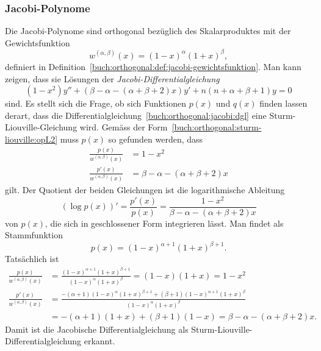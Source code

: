 \subsubsection{Jacobi-Polynome}
Die Jacobi-Polynome sind orthogonal bezüglich des Skalarproduktes
mit der Gewichtsfunktion
\[
w^{(\alpha,\beta)}(x) = (1-x)^\alpha(1+x)^\beta,
\]
definiert in Definition~\ref{buch:orthogonal:def:jacobi-gewichtsfunktion}.
Man kann zeigen, dass sie Lösungen der
{\em Jacobi-Diffe\-ren\-tial\-gleichung}
%
%
\begin{equation}
(1-x^2)y'' + (\beta-\alpha-(\alpha+\beta + 2)x)y' + n(n+\alpha+\beta+1)y=0
\label{buch:orthogonal:jacobi:dgl}
\end{equation}
sind.
Es stellt sich die Frage, ob sich Funktionen $p(x)$ und $q(x)$ finden lassen
derart, dass die Differentialgleichung~\eqref{buch:orthogonal:jacobi:dgl}
eine Sturm-Liouville-Gleichung wird.
Gemäss der Form~\eqref{buch:orthogonal:sturm-liouville:opL2} muss
$p(x)$ so gefunden werden, dass
\begin{align*}
\frac{p(x)}{w^{(\alpha,\beta)}(x)} &= 1-x^2 \\
\frac{p'(x)}{w^{(\alpha,\beta)}(x)} &= \beta-\alpha-(\alpha+\beta+2)x
\end{align*}
gilt.
Der Quotient der beiden Gleichungen ist die logarithmische Ableitung
\[
(\log p(x))'
=
\frac{p'(x)}{p(x)}
=
\frac{1-x^2}{\beta-\alpha-(\alpha+\beta+2)x}
\]
von $p(x)$,
die sich in geschlossener Form integrieren lässt.
Man findet als Stammfunktion
\[
p(x)
=
(1-x)^{\alpha+1}(1+x)^{\beta+1}.
\]
Tatsächlich ist
\begin{align*}
\frac{p(x)}{w^{(\alpha,\beta)}(x)}
&=
\frac{(1-x)^{\alpha+1}(1+x)^{\beta+1}}{(1-x)^\alpha(1+x)^\beta}
=
(1-x)(1+x)=1-x^2
\\
\frac{p'(x)}{w^{(\alpha,\beta)}(x)}
&=
\frac{
-(\alpha+1)
(1-x)^{\alpha}(1+x)^{\beta+1}
+
(\beta+1)
(1-x)^{\alpha+1}(1+x)^{\beta}
}{
(1-x)^{\alpha}(1+x)^{\beta}
}
\\
&=
-(\alpha+1)(1+x) + (\beta+1)(1-x)
=
\beta-\alpha-(\alpha+\beta+2)x.
\end{align*}
Damit ist
die Jacobische Differentialgleichung 
als Sturm-Liouville-Differentialgleichung erkannt.

%
%
